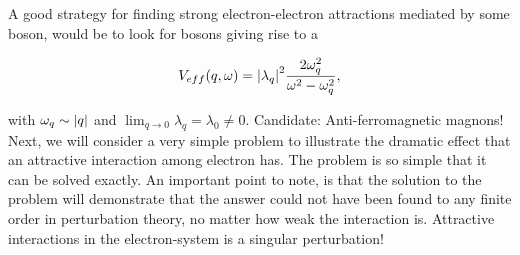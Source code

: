  A good strategy for finding strong electron-electron attractions mediated by some boson, would be to look for bosons giving rise to a 
 
 \begin{equation}
 V_{eff}(q,\omega) = \abs{\lambda_q}^2 \frac{2\omega_q ^2 }{\omega^2 - \omega_q ^2},
 \end{equation} 
 
 with  $\omega_q \sim \abs{q}$ and $\lim_{q \to 0} \lambda_q = \lambda_0 \neq 0$. Candidate: Anti-ferromagnetic magnons! \\
 
 Next, we will consider a very simple problem to illustrate the dramatic effect that an attractive interaction among electron has. The problem is so simple that it can be solved exactly. An important point to note, is that the solution to the problem will demonstrate that the answer could not have been found to any finite order in perturbation theory, no matter how weak the interaction is. Attractive interactions in the electron-system is a singular perturbation! 
 
 